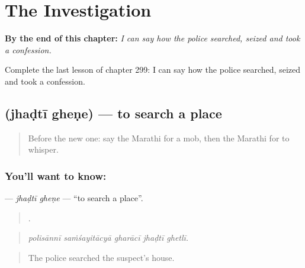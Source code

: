 
\chapter{The Investigation}
\label{ch:mr-the-investigation}

\begin{chapteropening}
\textbf{By the end of this chapter:} \emph{I can say how the police searched, seized and took a confession.}

Complete the last lesson of chapter 299: I can say how the police searched, seized and took a confession.
\end{chapteropening}

\section[\texorpdfstring{\mr{झडती} \mr{घेणे} (jhaḍtī gheṇe)}{झडती घेणे (jhaḍtī gheṇe)}]{  (jhaḍtī gheṇe) — to search a place}

\label{lesson:MR-C299-jhadti-ghene}



\begin{quote}
Before the new one: say the Marathi for a mob, then the Marathi for to whisper.
\end{quote}

\subsection*{You'll want to know:  }
\textbf{ } — \emph{jhaḍtī gheṇe} — \textquotedblleft{}to search a place\textquotedblright{}.

\begin{quote}
    .
\end{quote}

\begin{quote}
\emph{polisānnī saṁśayitācyā gharācī jhaḍtī ghetlī.}
\end{quote}

\begin{quote}
The police searched the suspect's house.
\end{quote}

